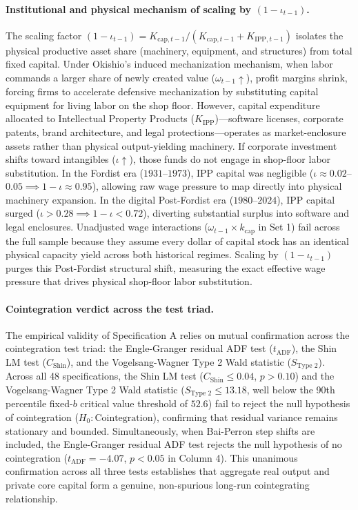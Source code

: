 \paragraph{Institutional and physical mechanism of scaling by $(1-\iota_{t-1})$.}
The scaling factor $(1-\iota_{t-1}) = K_{\text{cap},t-1} / (K_{\text{cap},t-1} + K_{\text{IPP},t-1})$ isolates the physical productive asset share (machinery, equipment, and structures) from total fixed capital. Under Okishio's induced mechanization mechanism, when labor commands a larger share of newly created value ($\omega_{t-1} \uparrow$), profit margins shrink, forcing firms to accelerate defensive mechanization by substituting capital equipment for living labor on the shop floor. However, capital expenditure allocated to Intellectual Property Products ($K_{\text{IPP}}$)---software licenses, corporate patents, brand architecture, and legal protections---operates as market-enclosure assets rather than physical output-yielding machinery. If corporate investment shifts toward intangibles ($\iota \uparrow$), those funds do not engage in shop-floor labor substitution. In the Fordist era ($1931$--$1973$), IPP capital was negligible ($\iota \approx 0.02$--$0.05 \implies 1-\iota \approx 0.95$), allowing raw wage pressure to map directly into physical machinery expansion. In the digital Post-Fordist era ($1980$--$2024$), IPP capital surged ($\iota > 0.28 \implies 1-\iota < 0.72$), diverting substantial surplus into software and legal enclosures. Unadjusted wage interactions ($\omega_{t-1} \times k_{\text{cap}}$ in Set 1) fail across the full sample because they assume every dollar of capital stock has an identical physical capacity yield across both historical regimes. Scaling by $(1-\iota_{t-1})$ purges this Post-Fordist structural shift, measuring the exact effective wage pressure that drives physical shop-floor labor substitution.

\paragraph{Cointegration verdict across the test triad.}
The empirical validity of Specification A relies on mutual confirmation across the cointegration test triad: the Engle-Granger residual ADF test ($t_{\text{ADF}}$), the Shin \citeyearpar{Shin1994} LM test ($C_{\text{Shin}}$), and the Vogelsang-Wagner Type 2 Wald statistic ($S_{\text{Type 2}}$). Across all 48 specifications, the Shin LM test ($C_{\text{Shin}} \le 0.04$, $p > 0.10$) and the Vogelsang-Wagner Type 2 Wald statistic ($S_{\text{Type 2}} \le 13.18$, well below the 90th percentile fixed-$b$ critical value threshold of $52.6$) fail to reject the null hypothesis of cointegration ($H_0: \text{Cointegration}$), confirming that residual variance remains stationary and bounded. Simultaneously, when Bai-Perron step shifts are included, the Engle-Granger residual ADF test rejects the null hypothesis of no cointegration ($t_{\text{ADF}} = -4.07$, $p < 0.05$ in Column 4). This unanimous confirmation across all three tests establishes that aggregate real output and private core capital form a genuine, non-spurious long-run cointegrating relationship.

